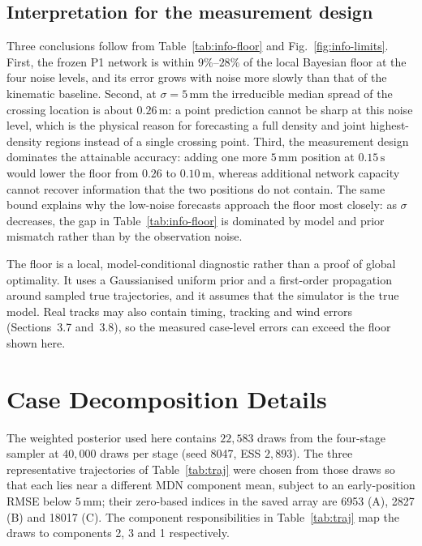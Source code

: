 \documentclass[11pt,a4paper]{article}
\begin{document}
\subsection{Interpretation for the measurement design}

Three conclusions follow from Table~\ref{tab:info-floor} and Fig.~\ref{fig:info-limits}.
First, the frozen P1 network is within $9\%$--$28\%$ of the local Bayesian floor at
the four noise levels, and its error grows with noise more slowly than that of the
kinematic baseline. Second, at $\sigma=5\,\mathrm{mm}$ the irreducible median
spread of the crossing location is about $0.26\,\mathrm{m}$: a point prediction
cannot be sharp at this noise level, which is the physical reason for forecasting a
full density and joint highest-density regions instead of a single crossing point.
Third, the measurement design dominates the attainable accuracy: adding one more
$5\,\mathrm{mm}$ position at $0.15\,\mathrm{s}$ would lower the floor from
$0.26$ to $0.10\,\mathrm{m}$, whereas additional network capacity cannot recover
information that the two positions do not contain.  The same bound explains why
the low-noise forecasts approach the floor most closely: as $\sigma$ decreases,
the gap in Table~\ref{tab:info-floor} is dominated by model and prior mismatch
rather than by the observation noise.

The floor is a local, model-conditional diagnostic rather than a proof of global
optimality. It uses a Gaussianised uniform prior and a first-order propagation
around sampled true trajectories, and it assumes that the simulator is the true
model. Real tracks may also contain timing, tracking and wind errors
(Sections~3.7 and~3.8), so the measured case-level errors can exceed the floor
shown here.

\section{Case Decomposition Details}
\label{app:decomp}

The weighted posterior used here contains $22{,}583$ draws from the four-stage sampler at $40{,}000$ draws per stage (seed 8047, ESS $2{,}893$). The three representative trajectories of Table~\ref{tab:traj} were chosen from those draws so that each lies near a different MDN component mean, subject to an early-position RMSE below $5\,\mathrm{mm}$; their zero-based indices in the saved array are 6953 (A), 2827 (B) and 18017 (C). The component responsibilities in Table~\ref{tab:traj} map the draws to components 2, 3 and 1 respectively.
\end{document}
